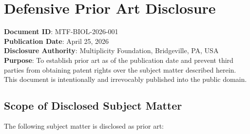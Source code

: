 \documentclass[12pt,letterpaper]{article}
\begin{document}
\newpage
\section{Defensive Prior Art Disclosure}
\label{sec:defensive}

\begin{disclosurebox}
\textbf{Document ID}: MTF-BIOL-2026-001 \\
\textbf{Publication Date}: April 25, 2026 \\
\textbf{Disclosure Authority}: Multiplicity Foundation, Bridgeville, PA, USA \\[0.5em]
\textbf{Purpose}: To establish prior art as of the publication date and prevent
third parties from obtaining patent rights over the subject matter described
herein. This document is intentionally and irrevocably published into the
public domain.
\end{disclosurebox}

\subsection{Scope of Disclosed Subject Matter}

The following subject matter is disclosed as prior art:
\end{document}
